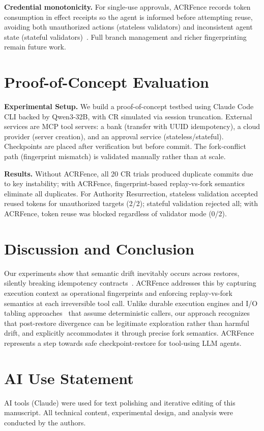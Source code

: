 \documentclass[sigplan,nonacm]{acmart}
\newcommand{\sys}{ACRFence}
\begin{document}
\textbf{Credential monotonicity.} For single-use approvals, \sys{} records token consumption in effect receipts so the agent is informed before attempting reuse, avoiding both unauthorized actions (stateless validators) and inconsistent agent state (stateful validators)~\cite{vault_issue_28378}. Full branch management and richer fingerprinting remain future work.

\section{Proof-of-Concept Evaluation}

\textbf{Experimental Setup.} We build a proof-of-concept testbed using Claude Code CLI backed by Qwen3-32B, with CR simulated via session truncation. External services are MCP tool servers: a bank (transfer with UUID idempotency), a cloud provider (server creation), and an approval service (stateless/stateful). Checkpoints are placed after verification but before commit. The fork-conflict path (fingerprint mismatch) is validated manually rather than at scale.

\textbf{Results.} Without \sys{}, all 20 CR trials produced duplicate commits due to key instability; with \sys{}, fingerprint-based replay-vs-fork semantics eliminate all duplicates. For Authority Resurrection, stateless validation accepted reused tokens for unauthorized targets (2/2); stateful validation rejected all; with \sys{}, token reuse was blocked regardless of validator mode (0/2).

\section{Discussion and Conclusion}

Our experiments show that semantic drift inevitably occurs across restores, silently breaking idempotency contracts~\cite{temporal_side_effects, langgraph_durable}. \sys{} addresses this by capturing execution context as operational fingerprints and enforcing replay-vs-fork semantics at each irreversible tool call. Unlike durable execution engines and I/O tabling approaches~\cite{somogyi2003iotabling, temporal_side_effects} that assume deterministic callers, our approach recognizes that post-restore divergence can be legitimate exploration rather than harmful drift, and explicitly accommodates it through precise fork semantics. \sys{} represents a step towards safe checkpoint-restore for tool-using LLM agents.


\section*{AI Use Statement}
AI tools (Claude) were used for text polishing and iterative editing of this manuscript. All technical content, experimental design, and analysis were conducted by the authors.



\end{document}

